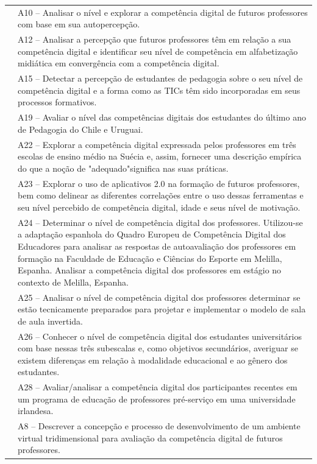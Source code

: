 \documentclass[portuguese]{textolivre}
\begin{document}
\begin{small}
\begin{longtable}{
    >{\raggedright\arraybackslash}p{}
    >{\raggedright\arraybackslash}p{}
    }
										 & A10 – Analisar o nível e explorar a competência digital de futuros professores com base em sua autopercepção.\\
										 & A12 – Analisar a percepção que futuros professores têm em relação a sua competência digital e identificar seu nível de competência em alfabetização midiática em convergência com a competência digital.\\
										 & A15 – Detectar a percepção de estudantes de pedagogia sobre o seu nível de competência digital e a forma como as TICs têm sido incorporadas em seus processos formativos.\\
										 & A19 – Avaliar o nível das competências digitais dos estudantes do último ano de Pedagogia do Chile e Uruguai.\\
										 & A22 – Explorar a competência digital expressada pelos professores em três escolas de ensino médio na Suécia e, assim, fornecer uma descrição empírica do que a noção de "adequado"significa nas suas práticas.\\
										 & A23 – Explorar o uso de aplicativos 2.0 na formação de futuros professores, bem como delinear as diferentes correlações entre o uso dessas ferramentas e seu nível percebido de competência digital, idade e seus nível de motivação.\\
										 & A24 – Determinar o nível de competência digital dos professores. Utilizou-se a adaptação espanhola do Quadro Europeu de Competência Digital dos Educadores para analisar as respostas de autoavaliação dos professores em formação na Faculdade de Educação e Ciências do Esporte em Melilla, Espanha. Analisar a competência digital dos professores em estágio no contexto de Melilla, Espanha.\\
										 & A25 – Analisar o nível de competência digital dos professores determinar se estão tecnicamente preparados para projetar e implementar o modelo de sala de aula invertida.\\
										 & A26 – Conhecer o nível de competência digital dos estudantes universitários com base nessas três subescalas e, como objetivos secundários, averiguar se existem diferenças em relação à modalidade educacional e ao gênero dos estudantes.\\
										 & A28 – Avaliar/analisar a competência digital dos participantes recentes em um programa de educação de professores pré-serviço em uma universidade irlandesa. \\
\midrule
\multirow[t]{2}{=}{Criação de instrumentos e ambientes para avaliação da CD} & A8 – Descrever a concepção e processo de desenvolvimento de um ambiente virtual tridimensional para avaliação da competência digital de futuros professores.\\

\end{longtable}
\end{small}
\end{document}
